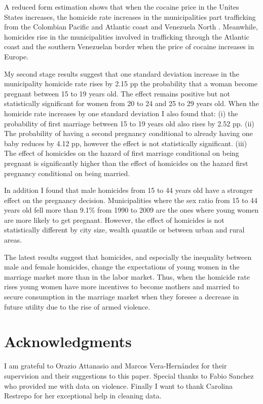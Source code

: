 \documentclass[a4paper,10pt,twocolumn,preprint,3p,authoryear]{elsarticle}
\begin{document}
A reduced form estimation shows that when the cocaine price in the Unites States increases, the homicide rate increases in the municipalities part trafficking from the Colombian Pacific and  Atlantic coast and Venezuela North . Meanwhile, homicides rise in the municipalities involved in trafficking through the Atlantic coast and the southern Venezuelan border when the price of cocaine increases in Europe. 

My second stage results suggest that one standard deviation increase in the municipality homicide rate  rises by 2.15 pp the probability that a woman become pregnant between 15 to 19 years old. The effect remains positive but not statistically significant for women from 20 to 24 and 25 to 29 years old. When the homicide rate increases by one standard deviation I also found that: (i) the probability of first marriage between 15 to 19 years old also rises by 2.52 pp. (ii) The probability of having a second pregnancy conditional to already having one baby reduces by 4.12 pp, however the effect is not statistically significant. (iii) The effect of homicides on the hazard of first marriage conditional on being pregnant is significantly higher than the effect of homicides on the hazard first pregnancy conditional on being married.

In addition I found that male homicides from 15 to 44 years old have a stronger effect on the pregnancy decision. Municipalities where the sex ratio from 15 to 44 years old fell more than 9.1\% from 1990 to 2009 are the ones where young women are more likely to get pregnant. However, the effect of homicides is not statistically different by city size, wealth quantile or between urban and rural areas. 

The latest results suggest that homicides, and especially the inequality between male and female homicides, change the expectations of young women in the marriage market more than in the labor market. Thus, when the homicide rate rises young women have more incentives to become mothers and married to secure consumption in the marriage market when they foresee a decrease in future utility due to the rise of armed violence. 

\section*{Acknowledgments} 
	I am grateful to Orazio Attanasio and Marcos Vera-Hern\'andez for their supervision and their suggestions to this paper. Special thanks to Fabio Sanchez who provided me with data on violence. Finally I want to thank Carolina Restrepo for her exceptional help in cleaning data.
\end{document}
